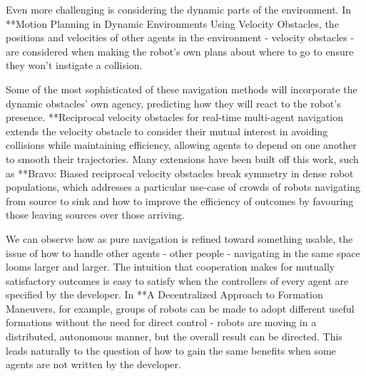 \documentclass{sfuthesis}
\begin{document}
Even more challenging is considering the dynamic parts of the environment. In **Motion Planning in Dynamic Environments Using Velocity Obstacles, the positions and velocities of other agents in the environment - velocity obstacles - are considered when making the robot's own plans about where to go to ensure they won't instigate a collision.

Some of the most sophisticated of these navigation methods will incorporate the dynamic obstacles' own agency, predicting how they will react to the robot's presence. **Reciprocal velocity obstacles for real-time multi-agent navigation extends the velocity obstacle to consider their mutual interest in avoiding collisions while maintaining efficiency, allowing agents to depend on one another to smooth their trajectories. Many extensions have been built off this work, such as **Bravo: Biased reciprocal velocity obstacles break symmetry in dense robot populations, which addresses a particular use-case of crowds of robots navigating from source to sink and how to improve the efficiency of outcomes by favouring those leaving sources over those arriving. 

We can observe how as pure navigation is refined toward something usable, the issue of how to handle other agents - other people - navigating in the same space looms larger and larger. The intuition that cooperation makes for mutually satisfactory outcomes is easy to satisfy when the controllers of every agent are specified by the developer. In **A Decentralized Approach to Formation Maneuvers, for example, groups of robots can be made to adopt different useful formations without the need for direct control - robots are moving in a distributed, autonomous manner, but the overall result can be directed. This leads naturally to the question of how to gain the same benefits when some agents are not written by the developer.










\end{document}
